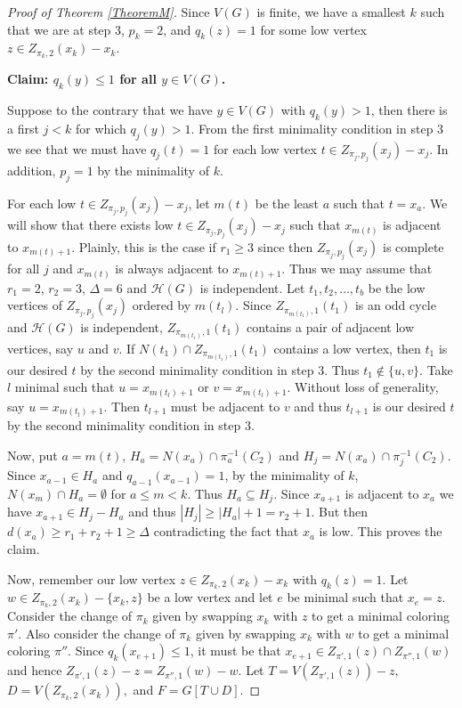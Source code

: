 \documentclass[11pt]{amsart}
\theoremstyle{plain}
\theoremstyle{definition}
\theoremstyle{remark}
\begin{document}
\begin{proof}[Proof of Theorem \ref{TheoremM}]
Since $V(G)$ is finite, we have a smallest $k$ such that we are at step 3,
$p_k = 2$, and $q_k(z) = 1$ for some low vertex $z \in Z_{\pi_k, 2}(x_k) - x_k$.\newline

\noindent\textbf{Claim: $q_k(y) \leq 1$ for all $y \in V(G)$.}

Suppose to the contrary that we have $y \in V(G)$ with $q_k(y) > 1$, then there is a first $j < k$ for which $q_j(y) > 1$.  From the first minimality condition in step 3 we see that we must have $q_j(t) = 1$ for each low vertex $t \in Z_{\pi_j, p_j}(x_j) - x_j$.  In addition, $p_j = 1$ by the minimality of $k$.

For each low $t \in Z_{\pi_j, p_j}(x_j) - x_j$, let $m(t)$ be the least $a$ such that $t = x_a$.  We will show that there exists low $t \in Z_{\pi_j, p_j}(x_j) - x_j$ such that $x_{m(t)}$ is adjacent to $x_{m(t) + 1}$.  Plainly, this is the case if $r_1 \geq 3$ since then $Z_{\pi_j, p_j}(x_j)$ is complete for all $j$ and $x_{m(t)}$ is always adjacent to $x_{m(t) + 1}$.  Thus we may assume that $r_1 = 2$, $r_2 = 3$, $\Delta = 6$ and $\mathcal{H}(G)$ is independent.  Let $t_1, t_2, \ldots, t_b$ be the low vertices of $Z_{\pi_j, p_j}(x_j)$ ordered by $m(t_l)$.  Since $ Z_{\pi_{m(t_1)}, 1}(t_1)$ is an odd cycle and $\mathcal{H}(G)$ is independent, $Z_{\pi_{m(t_1)}, 1}(t_1)$ contains a pair of adjacent low vertices, say $u$ and $v$. If $N(t_1) \cap Z_{\pi_{m(t_1)}, 1}(t_1)$ contains a low vertex, then $t_1$ is our desired $t$ by the second minimality condition in step 3.  Thus $t_1 \not \in \{u, v\}$.  Take $l$ minimal such that $u = x_{m(t_l) + 1}$ or $v = x_{m(t_l) + 1}$.  Without loss of generality, say $u = x_{m(t_l) + 1}$. Then $t_{l+1}$ must be adjacent to $v$ and thus $t_{l+1}$ is our desired $t$ by the second minimality condition in step 3.

Now, put $a = m(t)$, $H_a = N(x_a) \cap \pi_a^{-1}(C_2)$ and $H_j = N(x_a) \cap \pi_j^{-1}(C_2)$.  Since $x_{a-1} \in H_a$ and $q_{a-1}(x_{a-1}) = 1$, by the minimality of $k$, $N(x_m) \cap H_a = \emptyset$ for $a \leq m < k$.  Thus $H_a \subseteq H_j$.  Since $x_{a+1}$ is adjacent to $x_a$ we have $x_{a + 1} \in H_j - H_a$ and thus $|H_j| \geq |H_a| + 1 = r_2 + 1$.  But then $d(x_a) \geq r_1 + r_2 + 1 \geq \Delta$ contradicting the fact that $x_a$ is low. This proves the claim.

Now, remember our low vertex $z \in Z_{\pi_k, 2}(x_k) - x_k$  with $q_k(z) = 1$. Let $w \in Z_{\pi_k, 2}(x_k) - \{x_k, z\}$ be a low vertex and let $e$ be minimal such that $x_e = z$.  Consider the change of $\pi_k$ given by swapping $x_k$ with $z$ to get a minimal coloring $\pi'$.  Also consider the change of $\pi_k$ given by swapping $x_k$ with $w$ to get a minimal coloring $\pi''$. Since $q_k(x_{e+1}) \leq 1$, it must be that $x_{e+1} \in Z_{\pi', 1}(z) \cap Z_{\pi '', 1}(w)$ and hence $Z_{\pi ', 1}(z) - z = Z_{\pi'', 1}(w) - w$.  Let $T = V(Z_{\pi ', 1}(z)) - z$, $D = V(Z_{\pi_k, 2}(x_k)),$ and $F = G[T \cup D]$.


\end{proof}
\end{document}
